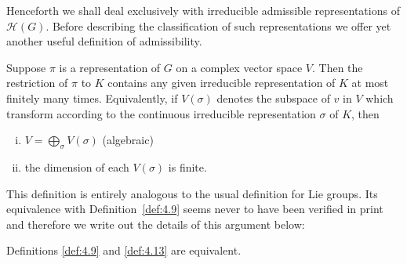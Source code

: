 Henceforth we shall deal exclusively with irreducible admissible representations of $\mathcal{H}(G)$. Before describing the classification of such representations we offer yet another useful definition of admissibility.

\begin{definition}\label{def:4.13}

Suppose $\pi$ is a representation of $G$ on a complex vector space $V$. Then the restriction of $\pi$ to $K$ contains any given irreducible representation of $K$ at most finitely many times. Equivalently, if $V(\sigma)$ denotes the subspace of $v$ in $V$ which transform according to the continuous irreducible representation $\sigma$ of $K$, then

\begin{enumerate}[(i)]

\item $V = \bigoplus_{\sigma} V(\sigma)$ (algebraic)

\item the dimension of each $V(\sigma)$ is finite.

\end{enumerate}

\end{definition}

This definition is entirely analogous to the usual definition for Lie groups. Its equivalence with Definition~\ref{def:4.9} seems never to have been verified in print and therefore we write out the details of this argument below:

\begin{lemma}\label{lem:4.14}

Definitions \ref{def:4.9} and \ref{def:4.13} are equivalent.

\end{lemma}

